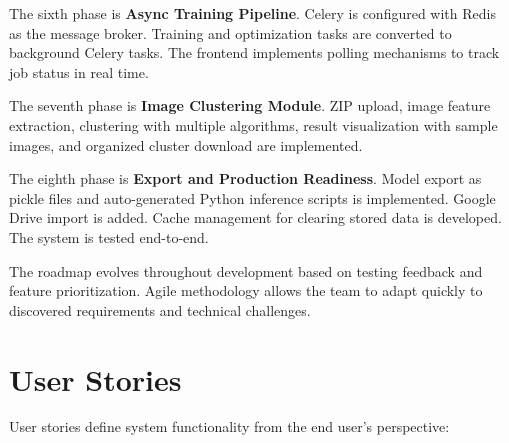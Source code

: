 \documentclass[12pt,a4paper]{report}
\begin{document}
The sixth phase is \textbf{Async Training Pipeline}. Celery is configured with Redis as the message broker. Training and optimization tasks are converted to background Celery tasks. The frontend implements polling mechanisms to track job status in real time.

The seventh phase is \textbf{Image Clustering Module}. ZIP upload, image feature extraction, clustering with multiple algorithms, result visualization with sample images, and organized cluster download are implemented.

The eighth phase is \textbf{Export and Production Readiness}. Model export as pickle files and auto-generated Python inference scripts is implemented. Google Drive import is added. Cache management for clearing stored data is developed. The system is tested end-to-end.

The roadmap evolves throughout development based on testing feedback and feature prioritization. Agile methodology allows the team to adapt quickly to discovered requirements and technical challenges.

\section{User Stories}

User stories define system functionality from the end user's perspective:
\end{document}

